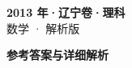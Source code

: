 \documentclass[zihao=-4, a4paper]{ctexart}
\begin{document}
\begin{center}
  {\Large\bfseries 2013 年·辽宁卷·理科}\\[4pt]
  {\large 数学 · 解析版}
\end{center}
\medskip
{}

\clearpage
{}
\begin{center}{\Large\bfseries 参考答案与详细解析}\end{center}
\medskip

\end{document}
